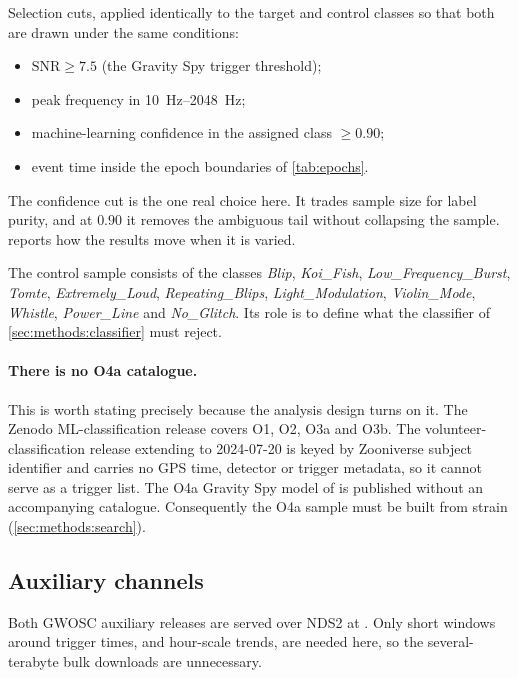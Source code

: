 Selection cuts, applied identically to the target and control classes so that
both are drawn under the same conditions:

\begin{itemize}
  \item $\mathrm{SNR} \geq 7.5$ (the Gravity Spy trigger threshold);
  \item peak frequency in \SIrange{10}{2048}{\hertz};
  \item machine-learning confidence in the assigned class $\geq 0.90$;
  \item event time inside the epoch boundaries of \cref{tab:epochs}.
\end{itemize}

The confidence cut is the one real choice here. It trades sample size for
label purity, and at $0.90$ it removes the ambiguous tail without collapsing
the sample.  reports how the results move when
it is varied.

The control sample consists of the classes \emph{Blip}, \emph{Koi\_Fish},
\emph{Low\_Frequency\_Burst}, \emph{Tomte}, \emph{Extremely\_Loud},
\emph{Repeating\_Blips}, \emph{Light\_Modulation}, \emph{Violin\_Mode},
\emph{Whistle}, \emph{Power\_Line} and \emph{No\_Glitch}. Its role is to define
what the classifier of \cref{sec:methods:classifier} must reject.

\paragraph{There is no O4a catalogue.} This is worth stating precisely because
the analysis design turns on it. The Zenodo ML-classification release covers
O1, O2, O3a and O3b. The volunteer-classification release extending to
2024-07-20 is keyed by Zooniverse subject identifier and carries no GPS time,
detector or trigger metadata, so it cannot serve as a trigger list. The O4a
Gravity Spy model of \citet{Wu2025} is published without an accompanying
catalogue. Consequently the O4a sample must be built from strain
(\cref{sec:methods:search}).

\subsection{Auxiliary channels}
\label{sec:data:aux}

Both GWOSC auxiliary releases are served over NDS2 at .
Only short windows around trigger times, and hour-scale trends, are needed
here, so the several-terabyte bulk downloads are unnecessary.

